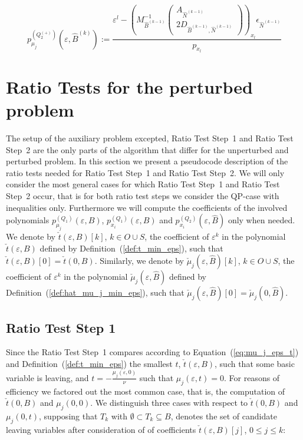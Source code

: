 \documentclass[a4paper]{article}
\newcommand{\pmu}[2]{\ensuremath{p_{\mu_{j}}^{(#1)}(\varepsilon, #2)}}
\newcommand{\px}[3]{\ensuremath{p_{x_{#1}}^{(#2)}(\varepsilon, #3)}}
\begin{document}
\begin{equation}
\pmu{Q_{2}^{(+)}}{\hat{B}^{(k)}} :=
  \frac{\varepsilon^{l} -
         \left(M_{\hat{B}^{(k-1)}}^{-1}
           \left(\begin{array}{c}
                    A_{\hat{N}^{(k-1)}}  \\
	            \hline
	            2D_{\hat{B}^{(k-1)}, \hat{N}^{(k-1)}}
	         \end{array}
	   \right)
         \right)_{x_{l}}\epsilon_{\hat{N}^{(k-1)}}}{p_{x_{l}}}
\end{equation}

\section{Ratio Tests for the perturbed problem}
The setup of the auxiliary problem excepted, Ratio Test Step~1 and Ratio Test
Step~2 are the only parts of the algorithm that differ for the unperturbed and
perturbed problem.
In this section we present a pseudocode description of the ratio tests needed
for Ratio Test Step~1 and Ratio Test Step~2. We will only consider the most
general cases for which Ratio Test Step~1 and Ratio Test Step~2 occur,
that is for both ratio test steps we consider the QP-case with
inequalities only. Furthermore we will compute the coefficients of the involved
polynomials $\pmu{Q_{1}}{B}$, $\px{i}{Q_{1}}{B}$ and $\px{i}{Q_{2}}{\hat{B}}$
only when needed. We denote by $\check{t}(\varepsilon, B)[k]$,
$k \in O \cup S$, the coefficient of $\varepsilon^{k}$ in the polynomial
$\check{t}(\varepsilon, B)$ defined by Definition~(\ref{def:t_min_eps}), such
that $\check{t}(\varepsilon, B)[0]=\check{t}(0, B)$. Similarly, we denote by
$\check{\mu}_{j}(\varepsilon, \hat{B})[k]$, $k \in O \cup S$, the coefficient
of $\varepsilon^{k}$ in the polynomial $\check{\mu}_{j}(\varepsilon, \hat{B})$
defined by Definition~(\ref{def:hat_mu_j_min_eps}), such that
$\check{\mu}_{j}(\varepsilon, \hat{B})[0]=\check{\mu}_{j}(0, \hat{B})$.

\subsection{Ratio Test Step 1}
Since the Ratio Test Step~1 compares according to
Equation~(\ref{eq:mu_j_eps_t})
and Definition~(\ref{def:t_min_eps}) the smallest $t$,
$\check{t}(\varepsilon, B)$, such that some basic variable is leaving, and
$t=-\frac{\mu_{j}(\varepsilon,0)}{\nu}$ such that $\mu_{j}(\varepsilon,t)=0$.
For reasons of efficiency we factored out the most common case, that is, the
computation of $\check{t}(0, B)$ and $\mu_{j}(0, 0)$. 
We distinguish three cases with respect to $\check{t}(0, B)$ and
$\mu_{j}(0, t)$, supposing that $T_{k}$ with
$\emptyset \subset T_{k} \subseteq B$, denotes the set of candidate
leaving variables after consideration of of
coefficients $\check{t}(\varepsilon, B)[j]$, $0 \leq j \leq k$:
\end{document}
